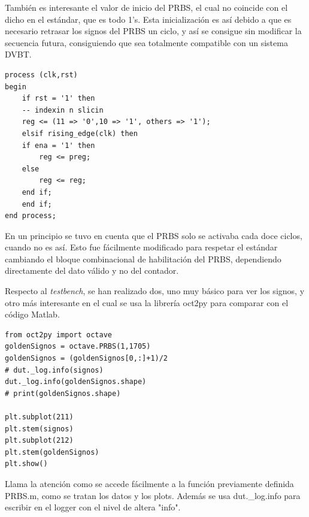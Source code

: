 \documentclass[11pt]{scrartcl} %
\begin{document}
\begin{preview}
También es interesante el valor de inicio del PRBS, el cual no coincide con el dicho en el estándar, que es todo 1's. Esta inicialización es así debido a que es necesario retrasar los signos del PRBS un ciclo, y así se consigue sin modificar la secuencia futura, consiguiendo que sea totalmente compatible con un sistema DVBT.

\begin{verbatim}
process (clk,rst)
begin
	if rst = '1' then
	-- indexin n slicin
	reg <= (11 => '0',10 => '1', others => '1');
	elsif rising_edge(clk) then
	if ena = '1' then
		reg <= preg;
	else
		reg <= reg;
	end if;
	end if;
end process;
\end{verbatim}

En un principio se tuvo en cuenta que el PRBS solo se activaba cada doce ciclos, cuando no es así. Esto fue fácilmente modificado para respetar el estándar cambiando el bloque combinacional de habilitación del PRBS, dependiendo directamente del dato válido y no del contador.

Respecto al \emph{testbench}, se han realizado dos, uno muy básico para ver los signos, y otro más interesante en el cual se usa la librería oct2py para comparar con el código Matlab.

\begin{verbatim}
from oct2py import octave
goldenSignos = octave.PRBS(1,1705)
goldenSignos = (goldenSignos[0,:]+1)/2
# dut._log.info(signos)
dut._log.info(goldenSignos.shape)
# print(goldenSignos.shape)

plt.subplot(211)
plt.stem(signos)
plt.subplot(212)
plt.stem(goldenSignos)
plt.show()
\end{verbatim}

Llama la atención como se accede fácilmente a la función previamente definida PRBS.m, como se tratan los datos y los plots. Además se usa dut.\_log.info para escribir en el logger con el nivel de altera "info".


\end{preview}
\end{document}
